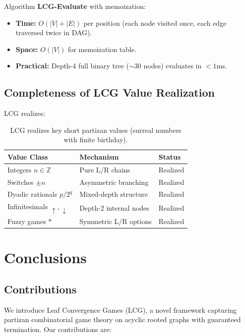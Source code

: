 \documentclass[10pt,a4paper,twocolumn]{article}
\theoremstyle{plain}
\theoremstyle{definition}
\theoremstyle{remark}
\begin{document}
Algorithm \textbf{LCG-Evaluate} with memoization:
\begin{itemize}
\item \textbf{Time:} $O(|V| + |E|)$ per position (each node visited once, each edge traversed twice in DAG).
\item \textbf{Space:} $O(|V|)$ for memoization table.
\item \textbf{Practical:} Depth-4 full binary tree ($\sim 30$ nodes) evaluates in $<1$ms.
\end{itemize}

\subsection{Completeness of LCG Value Realization}

LCG realizes:

\begin{table}[ht]
\centering
\small
\begin{tabular}{@{}lll@{}}
\toprule
Value Class & Mechanism & Status \\
\midrule
Integers $n \in \mathbb{Z}$ & Pure L/R chains & Realized \\
Switches $\pm n$ & Asymmetric branching & Realized \\
Dyadic rationals $p/2^q$ & Mixed-depth structure & Realized \\
Infinitesimals $\uparrow, \downarrow$ & Depth-2 internal nodes & Realized \\
Fuzzy games $*$ & Symmetric L/R options & Realized \\
\bottomrule
\end{tabular}
\caption{LCG realizes key short partizan values (surreal numbers with finite birthday).}
\end{table}

\section{Conclusions}

\subsection{Contributions}

We introduce Leaf Convergence Games (LCG), a novel framework capturing partizan combinatorial game theory on acyclic rooted graphs with guaranteed termination. Our contributions are:
\end{document}
